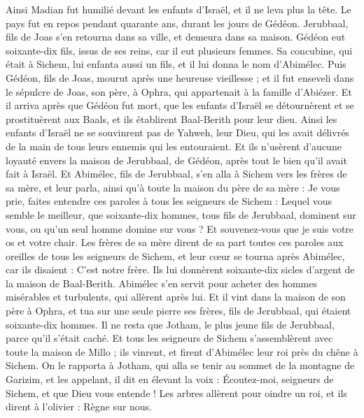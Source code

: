 \begin{multicols}{2}
Ainsi Madian fut humilié devant les enfants d'Israël, et il ne leva plus la tête. Le pays fut en repos pendant quarante ans, durant les jours de Gédéon.
Jerubbaal, fils de Joas s’en retourna dans sa ville, et demeura dans sa maison.
Gédéon eut soixante-dix fils, issus de ses reins, car il eut plusieurs femmes.
Sa concubine, qui était à Sichem, lui enfanta aussi un fils, et il lui donna le nom d’Abimélec.
Puis Gédéon, fils de Joas, mourut après une heureuse vieillesse ; et il fut enseveli dans le sépulcre de Joas, son père, à Ophra, qui appartenait à la famille d’Abiézer.
Et il arriva après que Gédéon fut mort, que les enfants d'Israël se détournèrent et se prostituèrent aux Baals, et ils établirent Baal-Berith pour leur dieu.
Ainsi les enfants d'Israël ne se souvinrent pas de Yahweh, leur Dieu, qui les avait délivrés de la main de tous leurs ennemis qui les entouraient.
Et ils n'usèrent d'aucune loyauté envers la maison de Jerubbaal, de Gédéon, après tout le bien qu'il avait fait à Israël.
\VerseOne{}Et Abimélec, fils de Jerubbaal, s'en alla à Sichem vers les frères de sa mère, et leur parla, ainsi qu'à toute la maison du père de sa mère :
Je vous prie, faites entendre ces paroles à tous les seigneurs de Sichem : Lequel vous semble le meilleur, que soixante-dix hommes, tous fils de Jerubbaal, dominent sur vous, ou qu'un seul homme domine sur vous ? Et souvenez-vous que je suis votre os et votre chair.
Les frères de sa mère dirent de sa part toutes ces paroles aux oreilles de tous les seigneurs de Sichem, et leur cœur se tourna après Abimélec, car ils disaient : C'est notre frère.
Ils lui donnèrent soixante-dix sicles d'argent de la maison de Baal-Berith. Abimélec s'en servit pour acheter des hommes misérables et turbulents, qui allèrent après lui.
Et il vint dans la maison de son père à Ophra, et tua sur une seule pierre ses frères, fils de Jerubbaal, qui étaient soixante-dix hommes. Il ne resta que Jotham, le plus jeune fils de Jerubbaal, parce qu'il s'était caché.
Et tous les seigneurs de Sichem s'assemblèrent avec toute la maison de Millo ; ils vinrent, et firent d'Abimélec leur roi près du chêne à Sichem.
On le rapporta à Jotham, qui alla se tenir au sommet de la montagne de Garizim, et les appelant, il dit en élevant la voix : Écoutez-moi, seigneurs de Sichem, et que Dieu vous entende !
Les arbres allèrent pour oindre un roi, et ils dirent à l'olivier : Règne sur nous.

\end{multicols}
